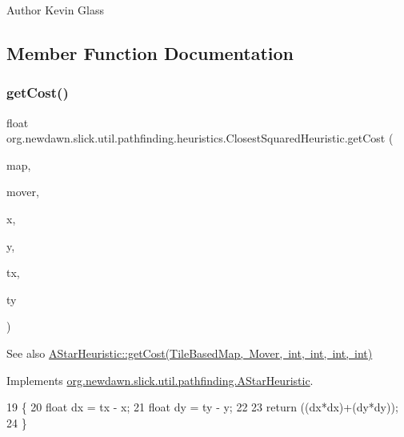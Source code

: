 \begin{DoxyAuthor}{Author}
Kevin Glass 
\end{DoxyAuthor}


\subsection{Member Function Documentation}
\mbox{\label{classorg_1_1newdawn_1_1slick_1_1util_1_1pathfinding_1_1heuristics_1_1_closest_squared_heuristic_a7e4d56d25f27fa036b806a2ef3035150}} 
\subsubsection{\texorpdfstring{get\+Cost()}{getCost()}}
{\footnotesize\ttfamily float org.\+newdawn.\+slick.\+util.\+pathfinding.\+heuristics.\+Closest\+Squared\+Heuristic.\+get\+Cost (\begin{DoxyParamCaption}\item[{\mbox{\hyperlink{interfaceorg_1_1newdawn_1_1slick_1_1util_1_1pathfinding_1_1_tile_based_map}{Tile\+Based\+Map}}}]{map,  }\item[{\mbox{\hyperlink{interfaceorg_1_1newdawn_1_1slick_1_1util_1_1pathfinding_1_1_mover}{Mover}}}]{mover,  }\item[{int}]{x,  }\item[{int}]{y,  }\item[{int}]{tx,  }\item[{int}]{ty }\end{DoxyParamCaption})\hspace{0.3cm}{\ttfamily [inline]}}

\begin{DoxySeeAlso}{See also}
\mbox{\hyperlink{interfaceorg_1_1newdawn_1_1slick_1_1util_1_1pathfinding_1_1_a_star_heuristic_a6655bf4053ece54e62beec26876ad285}{A\+Star\+Heuristic\+::get\+Cost(\+Tile\+Based\+Map, Mover, int, int, int, int)}} 
\end{DoxySeeAlso}


Implements \mbox{\hyperlink{interfaceorg_1_1newdawn_1_1slick_1_1util_1_1pathfinding_1_1_a_star_heuristic_a6655bf4053ece54e62beec26876ad285}{org.\+newdawn.\+slick.\+util.\+pathfinding.\+A\+Star\+Heuristic}}.


\begin{DoxyCode}
19                                                                                       \{     
20         \textcolor{keywordtype}{float} dx = tx - x;
21         \textcolor{keywordtype}{float} dy = ty - y;
22         
23         \textcolor{keywordflow}{return} ((dx*dx)+(dy*dy));
24     \}
\end{DoxyCode}
